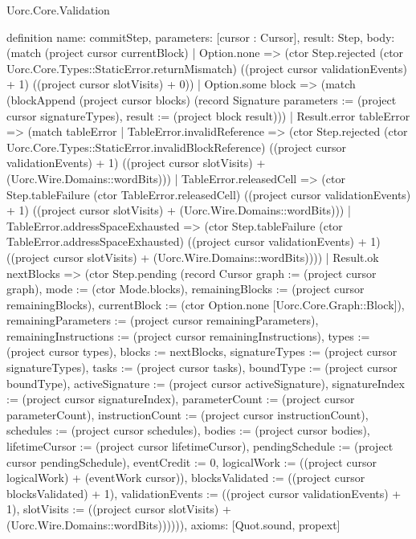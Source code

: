 \begin{lexlean}{Uorc.Core.Validation}
\begin{semanticmodule}
definition{
  name: commitStep,
  parameters: [cursor : Cursor],
  result: Step,
  body: (match (project cursor currentBlock)
    | Option.none => (ctor Step.rejected (ctor Uorc.Core.Types::StaticError.returnMismatch) ((project cursor validationEvents) + 1) ((project cursor slotVisits) + 0))
    | Option.some block => (match (blockAppend (project cursor blocks) (record Signature {parameters := (project cursor signatureTypes), result := (project block result)}))
      | Result.error tableError => (match tableError
        | TableError.invalidReference => (ctor Step.rejected (ctor Uorc.Core.Types::StaticError.invalidBlockReference) ((project cursor validationEvents) + 1) ((project cursor slotVisits) + (Uorc.Wire.Domains::wordBits)))
        | TableError.releasedCell => (ctor Step.tableFailure (ctor TableError.releasedCell) ((project cursor validationEvents) + 1) ((project cursor slotVisits) + (Uorc.Wire.Domains::wordBits)))
        | TableError.addressSpaceExhausted => (ctor Step.tableFailure (ctor TableError.addressSpaceExhausted) ((project cursor validationEvents) + 1) ((project cursor slotVisits) + (Uorc.Wire.Domains::wordBits))))
      | Result.ok nextBlocks => (ctor Step.pending (record Cursor {graph := (project cursor graph), mode := (ctor Mode.blocks), remainingBlocks := (project cursor remainingBlocks), currentBlock := (ctor Option.none [Uorc.Core.Graph::Block]), remainingParameters := (project cursor remainingParameters), remainingInstructions := (project cursor remainingInstructions), types := (project cursor types), blocks := nextBlocks, signatureTypes := (project cursor signatureTypes), tasks := (project cursor tasks), boundType := (project cursor boundType), activeSignature := (project cursor activeSignature), signatureIndex := (project cursor signatureIndex), parameterCount := (project cursor parameterCount), instructionCount := (project cursor instructionCount), schedules := (project cursor schedules), bodies := (project cursor bodies), lifetimeCursor := (project cursor lifetimeCursor), pendingSchedule := (project cursor pendingSchedule), eventCredit := 0, logicalWork := ((project cursor logicalWork) + (eventWork cursor)), blocksValidated := ((project cursor blocksValidated) + 1), validationEvents := ((project cursor validationEvents) + 1), slotVisits := ((project cursor slotVisits) + (Uorc.Wire.Domains::wordBits))})))),
  axioms: [Quot.sound, propext]
}


\end{semanticmodule}
\end{lexlean}
